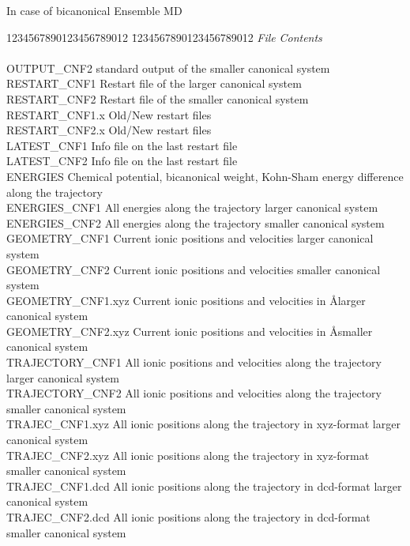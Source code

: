\documentclass[twoside,10pt,titlepage,a4paper]{article}
\begin{document}
In case of bicanonical Ensemble MD 
\begin{tabbing}
1234567890123456789012 \= 1234567890123456789012  \kill
\textsl{File}   \> \textsl{Contents}                     \\
\\
OUTPUT\_CNF2          \> standard output of the smaller canonical system \\
RESTART\_CNF1         \> Restart file of the larger canonical system \\
RESTART\_CNF2         \> Restart file of the smaller canonical system \\
RESTART\_CNF1.x       \> Old/New restart files                 \\
RESTART\_CNF2.x       \> Old/New restart files                 \\
LATEST\_CNF1          \> Info file on the last restart file    \\
LATEST\_CNF2          \> Info file on the last restart file    \\
ENERGIES             \> Chemical potential, bicanonical weight, Kohn-Sham energy difference along the trajectory     \\
ENERGIES\_CNF1        \> All energies along the trajectory  larger canonical system    \\
ENERGIES\_CNF2        \> All energies along the trajectory  smaller canonical system   \\
GEOMETRY\_CNF1        \> Current ionic positions and velocities larger canonical system \\
GEOMETRY\_CNF2        \> Current ionic positions and velocities smaller canonical system\\
GEOMETRY\_CNF1.xyz    \> Current ionic positions and velocities in \AA larger canonical system \\
GEOMETRY\_CNF2.xyz    \> Current ionic positions and velocities in \AA smaller canonical system\\
TRAJECTORY\_CNF1      \> All ionic positions and velocities along the trajectory larger canonical system\\
TRAJECTORY\_CNF2      \> All ionic positions and velocities along the trajectory smaller canonical system\\
TRAJEC\_CNF1.xyz      \> All ionic positions along the trajectory in xyz-format larger canonical system\\
TRAJEC\_CNF2.xyz      \> All ionic positions along the trajectory in xyz-format smaller canonical system\\
TRAJEC\_CNF1.dcd      \> All ionic positions along the trajectory in dcd-format larger canonical system\\
TRAJEC\_CNF2.dcd      \> All ionic positions along the trajectory in dcd-format smaller canonical system\\
\end{tabbing}
\end{document}
